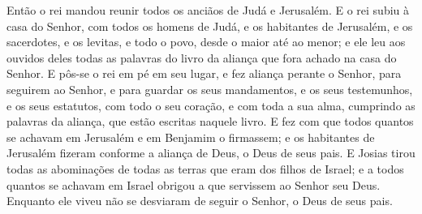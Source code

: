 Então o rei mandou reunir todos os anciãos de Judá e Jerusalém.
E o rei subiu à casa do Senhor, com todos os homens de Judá,
e os habitantes de Jerusalém, e os sacerdotes, e os levitas, e todo
o povo, desde o maior até ao menor; e ele leu aos ouvidos deles
todas as palavras do livro da aliança que fora achado na casa do
Senhor. E pôs-se o rei em pé em seu lugar, e fez aliança
perante o Senhor, para seguirem ao Senhor, e para guardar os seus
mandamentos, e os seus testemunhos, e os seus estatutos, com todo o
seu coração, e com toda a sua alma, cumprindo as palavras da
aliança, que estão escritas naquele livro. E fez com que
todos quantos se achavam em Jerusalém e em Benjamim o firmassem; e
os habitantes de Jerusalém fizeram conforme a aliança de Deus, o
Deus de seus pais. E Josias tirou todas as abominações de
todas as terras que eram dos filhos de Israel; e a todos quantos se
achavam em Israel obrigou a que servissem ao Senhor seu Deus.
Enquanto ele viveu não se desviaram de seguir o Senhor, o Deus de
seus pais.

\medskip

